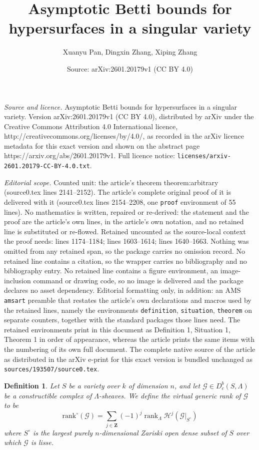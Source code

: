 \documentclass[10pt,a4paper]{amsart}
\title{Asymptotic Betti bounds for hypersurfaces in a singular variety}
\author{Xuanyu Pan, Dingxin Zhang, Xiping Zhang}
\date{Source: arXiv:2601.20179v1 (CC BY 4.0)}
\newtheorem{definition}{Definition}
\renewcommand{\mathbb}{\mathbf}
\begin{document}
\maketitle

\noindent\emph{Source and licence.} Asymptotic Betti bounds for hypersurfaces in a singular variety. Version arXiv:2601.20179v1 (CC BY 4.0), distributed by arXiv under the Creative Commons Attribution 4.0 International licence, http://creativecommons.org/licenses/by/4.0/, as recorded in the arXiv licence metadata for this exact version and shown on the abstract page https://arxiv.org/abs/2601.20179v1. Full licence notice: \texttt{licenses/arxiv-2601.20179-CC-BY-4.0.txt}.\par\smallskip

\noindent\textit{Editorial scope.} Counted unit: the article's theorem theorem:arbitrary (source0.tex lines 2141--2152). The article's complete original proof of it is delivered with it (source0.tex lines 2154--2208, one \texttt{proof} environment of 55 lines). No mathematics is written, repaired or re-derived: the statement and the proof are the article's own lines, in the article's own notation, and no retained line is substituted or re-flowed.  Retained uncounted as the source-local context the proof needs: lines 1174--1184; lines 1603--1614; lines 1640--1663.  Nothing was omitted from any retained span, so the package carries no omission record.  No retained line contains a citation, so the wrapper carries no bibliography and no bibliography entry.  No retained line contains a figure environment, an image-inclusion command or drawing code, so no image is delivered and the package declares no asset dependency.  Editorial formatting only, in addition: an AMS \texttt{amsart} preamble that restates the article's own declarations and macros used by the retained lines, namely the environments \texttt{definition}, \texttt{situation}, \texttt{theorem} on separate counters, together with the standard packages those lines need.  The retained environments print in this document as Definition 1, Situation 1, Theorem 1 in order of appearance, whereas the article prints the same items with the numbering of its own full document.  The complete native source of the article as distributed in the arXiv e-print for this exact version is bundled unchanged as \texttt{sources/193507/source0.tex}.
\begin{definition}\label{definition:vir-gen-rank}
Let \(S\) be a variety over \(k\) of dimension \(n\), and let
\(\mathcal{G} \in D^{b}_{c}(S,\Lambda)\) be a constructible complex of
\(\Lambda\)-sheaves.  We define the \emph{virtual generic rank} of
\(\mathcal{G}\) to be
\[
\mathrm{rank}^{\circ}(\mathcal{G}) = \sum_{j\in \mathbb{Z}} (-1)^{j} \operatorname{rank}_{\Lambda} \mathcal{H}^{j}(\mathcal{G}|_{S^{\circ}})
\]
where \(S^{\circ}\) is the largest purely \(n\)-dimensional Zariski
open dense subset of \(S\) over which \(\mathcal{G}\) is lisse.
\end{definition}
\end{document}
